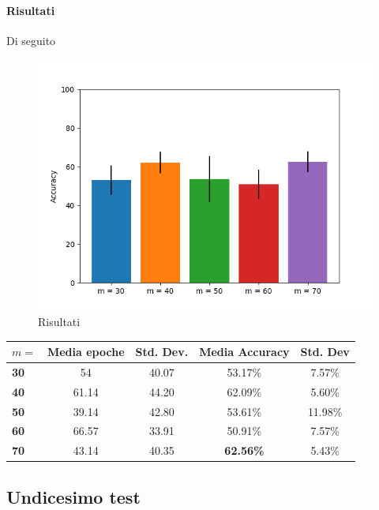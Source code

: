 \documentclass[11pt, a4paper, twoside, openright]{book}
\begin{document}
\paragraph{Risultati} Di seguito\\
\begin{figure}[h]
    \centering
    \includegraphics[scale=0.75]{img/episodic_m_test.png}
    \caption{Risultati}
    \label{fig:episodic_m_test}
\end{figure}
\begin{tabular}{l|c|c|c|c}
    \textbf{$m =$} & \textbf{Media epoche} & \textbf{Std. Dev.} & \textbf{Media Accuracy} & \textbf{Std. Dev} \\
    \hline 
    \textbf{30} & 54 & 40.07 & 53.17\% & 7.57\% \\
    \textbf{40} & 61.14 & 44.20 & 62.09\% & 5.60\%\\
    \textbf{50} & 39.14 & 42.80 & 53.61\% & 11.98\%\\
    \textbf{60} & 66.57 & 33.91 & 50.91\% & 7.57\%\\
    \textbf{70} & 43.14 & 40.35 & \textbf{62.56\%} & 5.43\%\\
\end{tabular}
\pagebreak
\subsection{Undicesimo test}
\end{document}
